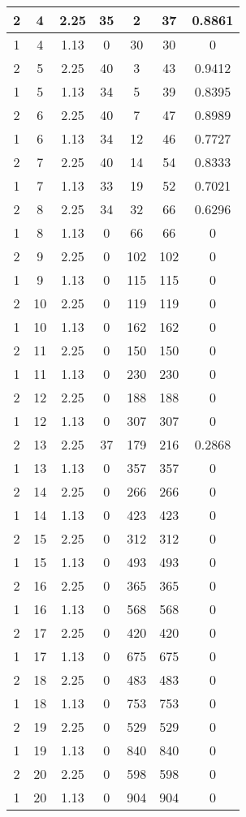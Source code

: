 \documentclass[letterpaper, 12pt]{article}
\begin{document}
\begin{longtable}{|c|c|c|c|c|c|c|}
\hline
2 & 4 & 2.25 & 35 & 2 & 37 & 0.8861 \\
\hline
1 & 4 & 1.13 & 0 & 30 & 30 & 0 \\
\hline
2 & 5 & 2.25 & 40 & 3 & 43 & 0.9412 \\
\hline
1 & 5 & 1.13 & 34 & 5 & 39 & 0.8395 \\
\hline
2 & 6 & 2.25 & 40 & 7 & 47 & 0.8989 \\
\hline
1 & 6 & 1.13 & 34 & 12 & 46 & 0.7727 \\
\hline
2 & 7 & 2.25 & 40 & 14 & 54 & 0.8333 \\
\hline
1 & 7 & 1.13 & 33 & 19 & 52 & 0.7021 \\
\hline
2 & 8 & 2.25 & 34 & 32 & 66 & 0.6296 \\
\hline
1 & 8 & 1.13 & 0 & 66 & 66 & 0 \\
\hline
2 & 9 & 2.25 & 0 & 102 & 102 & 0 \\
\hline
1 & 9 & 1.13 & 0 & 115 & 115 & 0 \\
\hline
2 & 10 & 2.25 & 0 & 119 & 119 & 0 \\
\hline
1 & 10 & 1.13 & 0 & 162 & 162 & 0 \\
\hline
2 & 11 & 2.25 & 0 & 150 & 150 & 0 \\
\hline
1 & 11 & 1.13 & 0 & 230 & 230 & 0 \\
\hline
2 & 12 & 2.25 & 0 & 188 & 188 & 0 \\
\hline
1 & 12 & 1.13 & 0 & 307 & 307 & 0 \\
\hline
2 & 13 & 2.25 & 37 & 179 & 216 & 0.2868 \\
\hline
1 & 13 & 1.13 & 0 & 357 & 357 & 0 \\
\hline
2 & 14 & 2.25 & 0 & 266 & 266 & 0 \\
\hline
1 & 14 & 1.13 & 0 & 423 & 423 & 0 \\
\hline
2 & 15 & 2.25 & 0 & 312 & 312 & 0 \\
\hline
1 & 15 & 1.13 & 0 & 493 & 493 & 0 \\
\hline
2 & 16 & 2.25 & 0 & 365 & 365 & 0 \\
\hline
1 & 16 & 1.13 & 0 & 568 & 568 & 0 \\
\hline
2 & 17 & 2.25 & 0 & 420 & 420 & 0 \\
\hline
1 & 17 & 1.13 & 0 & 675 & 675 & 0 \\
\hline
2 & 18 & 2.25 & 0 & 483 & 483 & 0 \\
\hline
1 & 18 & 1.13 & 0 & 753 & 753 & 0 \\
\hline
2 & 19 & 2.25 & 0 & 529 & 529 & 0 \\
\hline
1 & 19 & 1.13 & 0 & 840 & 840 & 0 \\
\hline
2 & 20 & 2.25 & 0 & 598 & 598 & 0 \\
\hline
1 & 20 & 1.13 & 0 & 904 & 904 & 0 \\
\hline
\end{longtable}
\end{document}
